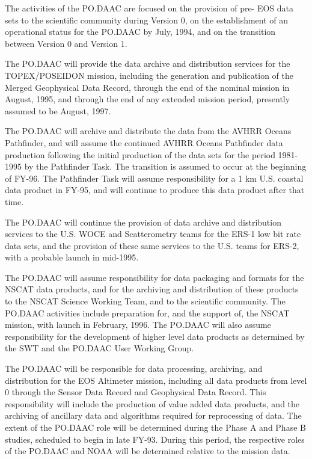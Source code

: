 	The activities of the PO.DAAC are focused on the provision of pre-
EOS data sets to the scientific community during Version 0, on the 
establishment of an operational status for the PO.DAAC by July, 1994, and 
on the transition between Version 0 and Version 1.

	The PO.DAAC will provide the data archive and distribution services 
for the \\TOPEX/POSEIDON mission, including the generation and publication 
of the Merged Geophysical Data Record, through the end of the nominal 
mission in August, 1995, and through the end of any extended mission 
period, presently assumed to be August, 1997.

	The PO.DAAC will archive and distribute the data from the AVHRR 
Oceans Pathfinder, and will assume the continued AVHRR Oceans 
Pathfinder data production following the initial production of the data 
sets for the period 1981-1995 by the Pathfinder Task.  The transition is 
assumed to occur at the beginning of FY-96.  The Pathfinder Task will 
assume responsibility for a 1 km U.S. coastal data product in FY-95, and 
will continue to produce this data product after that time.

	The PO.DAAC will continue the provision of data archive and 
distribution services to the U.S. WOCE and Scatterometry teams for the 
ERS-1 low bit rate data sets, and the provision of these same services to 
the U.S. teams for ERS-2, with a probable launch in mid-1995.

	The PO.DAAC will assume responsibility for data packaging and 
formats for the NSCAT data products, and for the archiving and 
distribution of these products to the NSCAT Science Working Team, and to 
the scientific community.  The PO.DAAC activities include preparation for, 
and the support of, the NSCAT mission, with launch in February, 1996.  The 
PO.DAAC will also assume responsibility for the development of higher 
level data products as determined by the SWT and the PO.DAAC User 
Working Group.

	The PO.DAAC will be responsible for data processing, archiving, and 
distribution for the EOS Altimeter mission, including all data products 
from level 0 through the Sensor Data Record and Geophysical Data Record.  
This responsibility will include the production of value added data 
products, and the archiving of ancillary data and algorithms required for 
reprocessing of data.  The extent of the PO.DAAC role will be determined 
during the Phase A and Phase B studies, scheduled to begin in late FY-93.  
During this period, the respective roles of the PO.DAAC and NOAA will be 
determined relative to the mission data.

